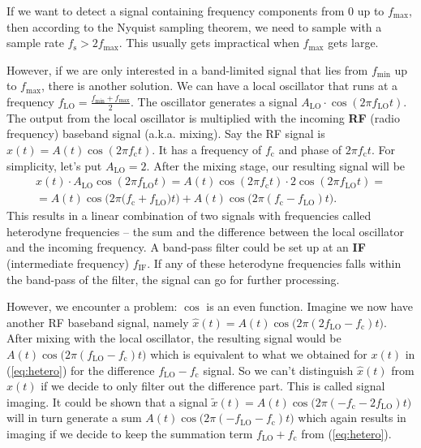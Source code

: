 \documentclass[a4paper,12pt,twoside,openright]{report}
\begin{document}
If we want to detect a signal containing frequency components from $0$ up to $f_\text{max}$, then according to the Nyquist sampling theorem, we need to sample with a sample rate $f_\text{s} > 2 f_\text{max}$. This usually gets impractical when $f_\text{max}$ gets large.

However, if we are only interested in a band-limited signal that lies from $f_\text{min}$ up to $f_\text{max}$, there is another solution. We can have a local oscillator that runs at a frequency $f_\text{LO} = \frac{f_\text{min}+f_\text{max}}{2}$. The oscillator generates a signal $A_\text{LO} \cdot \cos(2 \pi f_\text{LO} t)$. The output from the local oscillator is multiplied with the incoming \textbf{RF} (radio frequency) baseband signal (a.k.a. mixing). Say the RF signal is $x(t) = A(t) \cos(2 \pi f_\text{c} t)$. It has a frequency of $f_\text{c}$ and phase of $2 \pi f_\text{c} t$. For simplicity, let's put $A_\text{LO} = 2$. After the mixing stage, our resulting signal will be
\begin{multline}
\label{eq:hetero}
x(t) \cdot A_\text{LO} \cos(2 \pi f_\text{LO} t) =  A(t) \cos(2 \pi f_\text{c} t) \cdot 2 \cos(2 \pi f_\text{LO} t) = \\
=  A(t) \cos\big( 2 \pi (f_\text{c} + f_\text{LO} \big) t\big) + A(t) \cos\big( 2 \pi (f_\text{c} - f_\text{LO}) t \big) .
\end{multline}
This results in a linear combination of two signals with frequencies called heterodyne frequencies -- the sum and the difference between the local oscillator and the incoming frequency. A band-pass filter could be set up at an \textbf{IF} (intermediate frequency) $f_\text{IF}$. If any of these heterodyne frequencies falls within the band-pass of the filter, the signal can go for further processing.

However, we encounter a problem: $\cos$ is an even function. Imagine we now have another RF baseband signal, namely $\hat{x}(t) = A(t) \cos\big( 2 \pi (2 f_\text{LO} - f_\text{c}) t\big)$. After mixing with the local oscillator, the resulting signal would be $A(t) \cos\big( 2 \pi (f_\text{LO} - f_\text{c}) t \big)$ which is equivalent to what we obtained for $x(t)$ in (\ref{eq:hetero}) for the difference $f_\text{LO} - f_\text{c}$ signal. So we can't distinguish $\hat{x}(t)$ from $x(t)$ if we decide to only filter out the difference part. This is called signal imaging. It could be shown that a signal $\tilde{x}(t) = A(t) \cos\big( 2 \pi (- f_\text{c} - 2 f_\text{LO}) t\big)$ will in turn generate a sum $A(t) \cos\big( 2 \pi ( - f_\text{LO} - f_\text{c}) t \big)$ which again results in imaging if we decide to keep the summation term $f_\text{LO} + f_\text{c}$ from (\ref{eq:hetero}).
\end{document}
